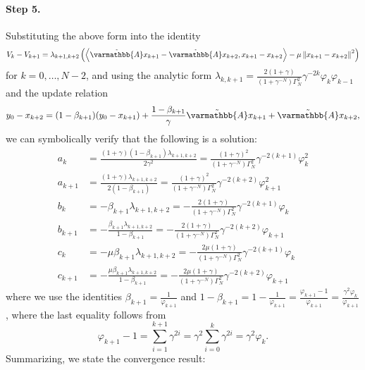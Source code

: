 \documentclass{article}
\theoremstyle{definition}
\theoremstyle{plain}
\newcommand{\opA}{{\varmathbb{A}}}
\newcommand{\inprod}[2]{\left\langle #1,#2 \right\rangle}
\newcommand{\sqnorm}[1]{\left\| #1 \right\|^2}
\newcommand{\topa}{\tilde{\opA}}
\begin{document}
\paragraph{Step 5.}
Substituting the above form into the identity
\begin{align}
\label{eqn:oc-halpern-lyapunov-difference}
    V_k-V_{k+1}
    =
    \lambda_{k+1,k+2}
    \left(
    \inprod{\topa x_{k+1}-\topa x_{k+2}}{x_{k+1}-x_{k+2}}
    -\mu\sqnorm{x_{k+1}-x_{k+2}}
    \right)
\end{align}
for $k=0,\dots,N-2$, and using the analytic form 
$\lambda_{k,k+1} = \frac{2(1+\gamma)}{(1+\gamma^{-N})\Gamma_N^2} \gamma^{-2k}\varphi_k\varphi_{k-1}$ 
and the update relation
\[
    y_0-x_{k+2}
    =
    (1-\beta_{k+1})(y_0-x_{k+1})
    +\frac{1-\beta_{k+1}}{\gamma}\topa x_{k+1}
    +\topa x_{k+2},
\]
we can symbolically verify that the following is a solution:
\begin{align*}
    a_k &= \frac{(1+\gamma)(1-\beta_{k+1})\lambda_{k+1,k+2}}{2\gamma^2} =
    \frac{(1+\gamma)^2}{(1+\gamma^{-N})\Gamma_N^2}
    \gamma^{-2(k+1)}\varphi_k^2  \\
    a_{k+1} & = \frac{(1+\gamma)\lambda_{k+1,k+2}}{2(1-\beta_{k+1})} = \frac{(1+\gamma)^2}{(1+\gamma^{-N})\Gamma_N^2}
    \gamma^{-2(k+2)}\varphi_{k+1}^2 \\
    b_k &= -\beta_{k+1} \lambda_{k+1,k+2} = -\frac{2(1+\gamma)}{(1+\gamma^{-N})\Gamma_N^2}
    \gamma^{-2(k+1)}\varphi_k \\
    b_{k+1} &= -\frac{\beta_{k+1} \lambda_{k+1,k+2}}{1-\beta_{k+1}} = 
    -\frac{2(1+\gamma)}{(1+\gamma^{-N})\Gamma_N^2} \gamma^{-2(k+2)}\varphi_{k+1} \\
    c_k &= - \mu \beta_{k+1} \lambda_{k+1,k+2} = 
    -\frac{2\mu(1+\gamma)}{(1+\gamma^{-N})\Gamma_N^2} \gamma^{-2(k+1)}\varphi_k \\
    c_{k+1} &= -\frac{\mu\beta_{k+1} \lambda_{k+1,k+2}}{1-\beta_{k+1}} =
    -\frac{2\mu(1+\gamma)}{(1+\gamma^{-N})\Gamma_N^2} \gamma^{-2(k+2)}\varphi_{k+1}
\end{align*}
where we use the identities $\beta_{k+1} = \frac{1}{\varphi_{k+1}}$ and $1-\beta_{k+1} = 1-\frac{1}{\varphi_{k+1}} = \frac{\varphi_{k+1}-1}{\varphi_{k+1}} = \frac{\gamma^2 \varphi_k}{\varphi_{k+1}}$, where the last equality follows from
\[
    \varphi_{k+1} - 1 = \sum_{i=1}^{k+1} \gamma^{2i} = \gamma^2 \sum_{i=0}^k \gamma^{2i} = \gamma^2 \varphi_k .
\]
Summarizing, we state the convergence result:
\end{document}
